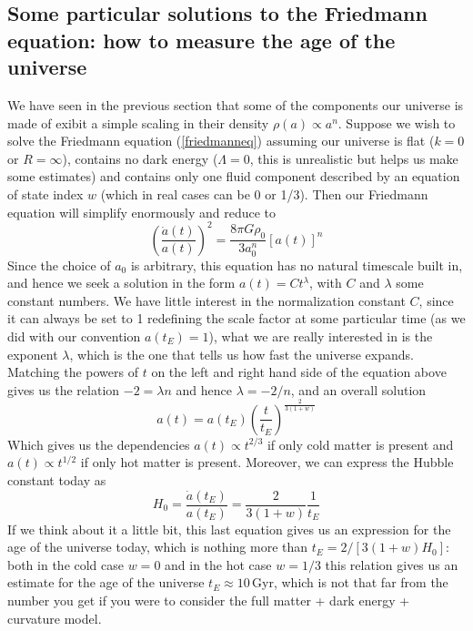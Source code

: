 \subsection{Some particular solutions to the Friedmann equation: how to measure the age of the universe}
We have seen in the previous section that some of the components our universe is made of exibit a simple scaling in their density $\rho(a)\propto a^{n}$. Suppose we wish to solve the Friedmann equation (\ref{friedmanneq}) assuming our universe is flat ($k=0$ or $R=\infty$), contains no dark energy ($\Lambda = 0$, this is unrealistic but helps us make some estimates) and contains only one fluid component described by an equation of state index $w$ (which in real cases can be 0 or 1/3). Then our Friedmann equation will simplify enormously and reduce to 
\begin{equation}
\left(\frac{\dot{a}(t)}{a(t)}\right)^2=\frac{8\pi G\rho_0}{3a_0^n}[a(t)]^n
\end{equation}
Since the choice of $a_0$ is arbitrary, this equation has no natural timescale built in, and hence we seek a solution in the form $a(t)=Ct^\lambda$, with $C$ and $\lambda$ some constant numbers. We have little interest in the normalization constant $C$, since it can always be set to 1 redefining the scale factor at some particular time (as we did with our convention $a(t_E)=1$), what we are really interested in is the exponent $\lambda$, which is the one that tells us how fast the universe expands. Matching the powers of $t$ on the left and right hand side of the equation above gives us the relation $-2=\lambda n$ and hence $\lambda=-2/n$, and an overall solution
\begin{equation}
a(t)=a(t_E)\left(\frac{t}{t_E}\right)^{\frac{2}{3(1+w)}}
\end{equation}
Which gives us the dependencies $a(t)\propto t^{2/3}$ if only cold matter is present and $a(t)\propto t^{1/2}$ if only hot matter is present. Moreover, we can express the Hubble constant today as
\begin{equation}
H_0=\frac{\dot{a}(t_E)}{a(t_E)}=\frac{2}{3(1+w)}\frac{1}{t_E}
\end{equation}
If we think about it a little bit, this last equation gives us an expression for the age of the universe today, which is nothing more than $t_E=2/[3(1+w)H_0]$: both in the cold case $w=0$ and in the hot case $w=1/3$ this relation gives us an estimate for the age of the universe $t_E\approx 10$\,Gyr, which is not that far from the number you get if you were to consider the full matter + dark energy + curvature model. 
